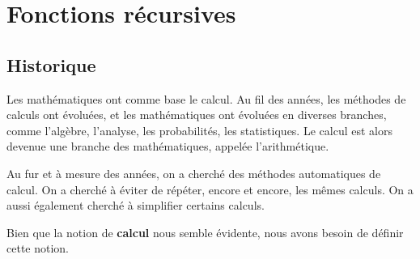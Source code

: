 \chapter{Fonctions récursives}


\section{Historique}

Les mathématiques ont comme base le calcul. %
Au fil des années, les méthodes de calculs ont évoluées, et les mathématiques ont
évoluées en diverses branches, comme l'algèbre, l'analyse, les probabilités, les
statistiques. Le calcul est alors devenue une branche des mathématiques, appelée
l'arithmétique.

Au fur et à mesure des années, on a cherché des méthodes automatiques de calcul.
On a cherché à éviter de répéter, encore et encore, les mêmes calculs. On a
aussi également cherché à simplifier certains calculs. %

Bien que la notion de \textbf{calcul} nous semble évidente, nous avons besoin de
définir cette notion.

